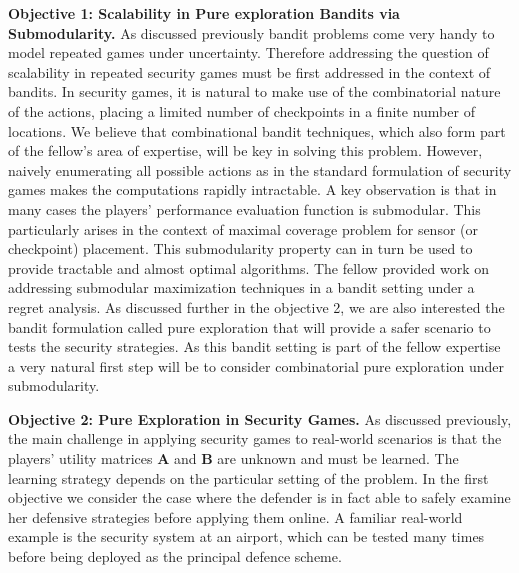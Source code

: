 \textbf{Objective 1: Scalability in Pure exploration Bandits via Submodularity.}
As discussed previously bandit problems come very handy to model repeated games under uncertainty. Therefore addressing the question of scalability in repeated security games must be first addressed in the context of bandits. In security games, it is natural to make use of the combinatorial nature of the actions, placing a limited number of checkpoints in a finite number of locations. We believe that combinational  bandit techniques, which also form part of the fellow's area of expertise, will be key in solving this problem. However, naively enumerating all possible actions as in the standard formulation of security games makes the computations rapidly intractable.  A key observation is that in many cases the players' performance evaluation function is submodular. This particularly arises in the context of maximal coverage problem for sensor (or checkpoint) placement\cite{krause2011randomized}. 
 This submodularity property can in turn be used to provide tractable and almost optimal algorithms. The fellow provided work on addressing submodular maximization techniques in a bandit setting\cite{gabillon2013adaptive} under a regret analysis.  As discussed further in the objective 2, we are also interested the bandit formulation called pure exploration that will provide a safer scenario to tests the security strategies. As this bandit setting is part of the fellow expertise a very natural first step will be to consider combinatorial pure exploration under submodularity.
 
 
 
\textbf{Objective 2: Pure Exploration in Security Games.}
As discussed previously, the main challenge in applying security games to real-world scenarios is that the players' utility matrices $\boldsymbol A$ and $\boldsymbol B$ are unknown and must be learned. The learning strategy depends on the particular setting of the problem. In the first objective we consider the case where the defender is in fact able to safely examine her defensive strategies before applying them online. A familiar real-world example is the security system at an airport, which can be tested many times before being deployed as the principal defence scheme.

